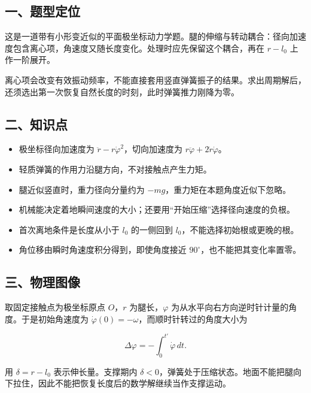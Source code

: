 \documentclass[12pt,a4paper,fontset=fandol]{ctexart}
\providecommand{\tightlist}{\setlength{\itemsep}{0pt}\setlength{\parskip}{0pt}}
\begin{document}
\subsection{一、题型定位}\label{ux4e00ux9898ux578bux5b9aux4f4d-1}

这是一道带有小形变近似的平面极坐标动力学题。腿的伸缩与转动耦合：径向加速度包含离心项，角速度又随长度变化。处理时应先保留这个耦合，再在
\(r-l_0\) 上作一阶展开。

离心项会改变有效振动频率，不能直接套用竖直弹簧振子的结果。求出周期解后，还须选出第一次恢复自然长度的时刻，此时弹簧推力刚降为零。

\subsection{二、知识点}\label{ux4e8cux77e5ux8bc6ux70b9-1}

\begin{itemize}
\tightlist
\item
  极坐标径向加速度为 \(\ddot r-r\dot\varphi^2\)，切向加速度为
  \(r\ddot\varphi+2\dot r\dot\varphi\)。
\item
  轻质弹簧的作用力沿腿方向，不对接触点产生力矩。
\item
  腿近似竖直时，重力径向分量约为 \(-mg\)，重力矩在本题角度近似下忽略。
\item
  机械能决定着地瞬间速度的大小；还要用``开始压缩''选择径向速度的负根。
\item
  首次离地条件是长度从小于 \(l_0\) 的一侧回到
  \(l_0\)，不能选择初始根或更晚的根。
\item
  角位移由瞬时角速度积分得到，即使角度接近
  \(90^\circ\)，也不能把其变化率置零。
\end{itemize}

\subsection{三、物理图像}\label{ux4e09ux7269ux7406ux56feux50cf-1}

取固定接触点为极坐标原点 \(O\)，\(r\) 为腿长，\(\varphi\)
为从水平向右方向逆时针计量的角度。于是初始角速度为
\(\dot\varphi(0)=-\omega\)，而顺时针转过的角度大小为

\[
\Delta\varphi=-\int_0^{t'}\dot\varphi\,dt.
\]

用 \(\delta=r-l_0\) 表示伸长量。支撑期内
\(\delta<0\)，弹簧处于压缩状态。地面不能把腿向下拉住，因此不能把恢复长度后的数学解继续当作支撑运动。
\end{document}
